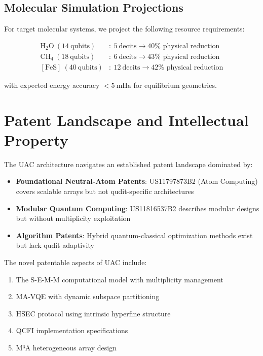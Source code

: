 \documentclass[12pt, a4paper]{article}
\begin{document}
\subsection{Molecular Simulation Projections}
For target molecular systems, we project the following resource requirements:

\begin{align}
\text{H}_2\text{O} \ (14\ \text{qubits}) &: \ 5\ \text{decits} \rightarrow 40\% \text{ physical reduction} \\
\text{CH}_4 \ (18\ \text{qubits}) &: \ 6\ \text{decits} \rightarrow 43\% \text{ physical reduction} \\
[\text{FeS}] \ (40\ \text{qubits}) &: \ 12\ \text{decits} \rightarrow 42\% \text{ physical reduction}
\end{align}

with expected energy accuracy $< 5\ \text{mHa}$ for equilibrium geometries.

\section{Patent Landscape and Intellectual Property}
\label{sec:patent}

The UAC architecture navigates an established patent landscape dominated by:

\begin{itemize}
    \item \textbf{Foundational Neutral-Atom Patents}: US11797873B2 (Atom Computing) covers scalable arrays but not qudit-specific architectures
    \item \textbf{Modular Quantum Computing}: US11816537B2 describes modular designs but without multiplicity exploitation
    \item \textbf{Algorithm Patents}: Hybrid quantum-classical optimization methods exist but lack qudit adaptivity
\end{itemize}

The novel patentable aspects of UAC include:
\begin{enumerate}
    \item The S-E-M-M computational model with multiplicity management
    \item MA-VQE with dynamic subspace partitioning
    \item HSEC protocol using intrinsic hyperfine structure
    \item QCFI implementation specifications
    \item M³A heterogeneous array design
\end{enumerate}
\end{document}
